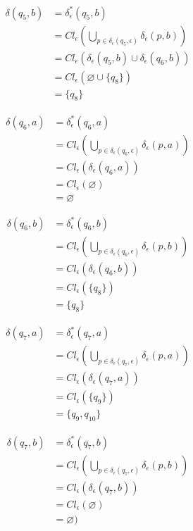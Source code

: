 \documentclass{article}
\begin{document}
\begin{enumerate}
{\begin{enumerate}
{					\begin{align*}
						\delta(q_{5}, b) &= \delta^{*}_{\epsilon}(q_{5}, b) \\
						&= Cl_{\epsilon}(\bigcup_{p \in \delta_{\epsilon}(q_{5}, \epsilon)}
						{\delta_{\epsilon}(p, b)}) \\
						&= Cl_{\epsilon}(\delta_{\epsilon}(q_{5}, b) 
						\cup \delta_{\epsilon}(q_{6}, b))\\
						&= Cl_{\epsilon}(\varnothing \cup \{q_{8}\})\\
						&= \{q_{8}\}
					\end{align*}

					\begin{align*}
						\delta(q_{6}, a) &= \delta^{*}_{\epsilon}(q_{6}, a) \\
						&= Cl_{\epsilon}(\bigcup_{p \in \delta_{\epsilon}(q_{6}, \epsilon)}
						{\delta_{\epsilon}(p, a)}) \\
						&= Cl_{\epsilon}(\delta_{\epsilon}(q_{6}, a))\\
						&= Cl_{\epsilon}(\varnothing)\\
						&= \varnothing
					\end{align*}

					\begin{align*}
						\delta(q_{6}, b) &= \delta^{*}_{\epsilon}(q_{6}, b) \\
						&= Cl_{\epsilon}(\bigcup_{p \in \delta_{\epsilon}(q_{6}, \epsilon)}
						{\delta_{\epsilon}(p, b)}) \\
						&= Cl_{\epsilon}(\delta_{\epsilon}(q_{6}, b))\\
						&= Cl_{\epsilon}(\{q_{8}\})\\
						&= \{q_{8}\}
					\end{align*}

					\begin{align*}
						\delta(q_{7}, a) &= \delta^{*}_{\epsilon}(q_{7}, a) \\
						&= Cl_{\epsilon}(\bigcup_{p \in \delta_{\epsilon}(q_{7}, \epsilon)}
						{\delta_{\epsilon}(p, a)}) \\
						&= Cl_{\epsilon}(\delta_{\epsilon}(q_{7}, a))\\
						&= Cl_{\epsilon}(\{q_{9}\})\\
						&= \{q_{9}, q_{10}\}
					\end{align*}

					\begin{align*}
						\delta(q_{7}, b) &= \delta^{*}_{\epsilon}(q_{7}, b) \\
						&= Cl_{\epsilon}(\bigcup_{p \in \delta_{\epsilon}(q_{7}, \epsilon)}
						{\delta_{\epsilon}(p, b)}) \\
						&= Cl_{\epsilon}(\delta_{\epsilon}(q_{7}, b))\\
						&= Cl_{\epsilon}(\varnothing)\\
						&= \varnothing)
					\end{align*}

}
\end{enumerate}}
\end{enumerate}
\end{document}
